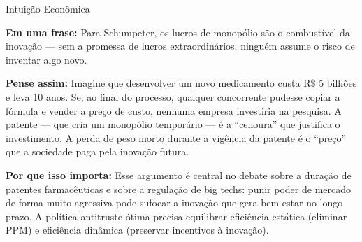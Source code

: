 \documentclass[11pt,twoside,openright]{book}
\begin{document}
\begin{intuitionbox}{Intuição Econômica}

\textbf{Em uma frase:} Para Schumpeter, os lucros de monopólio são o
combustível da inovação --- sem a promessa de lucros extraordinários,
ninguém assume o risco de inventar algo novo.

\textbf{Pense assim:} Imagine que desenvolver um novo medicamento custa
R\$ 5 bilhões e leva 10 anos. Se, ao final do processo, qualquer
concorrente pudesse copiar a fórmula e vender a preço de custo, nenhuma
empresa investiria na pesquisa. A patente --- que cria um monopólio
temporário --- é a ``cenoura'' que justifica o investimento. A perda de
peso morto durante a vigência da patente é o ``preço'' que a sociedade
paga pela inovação futura.

\textbf{Por que isso importa:} Esse argumento é central no debate sobre
a duração de patentes farmacêuticas e sobre a regulação de big techs:
punir poder de mercado de forma muito agressiva pode sufocar a inovação
que gera bem-estar no longo prazo. A política antitruste ótima precisa
equilibrar eficiência estática (eliminar PPM) e eficiência dinâmica
(preservar incentivos à inovação).

\end{intuitionbox}
\end{document}
